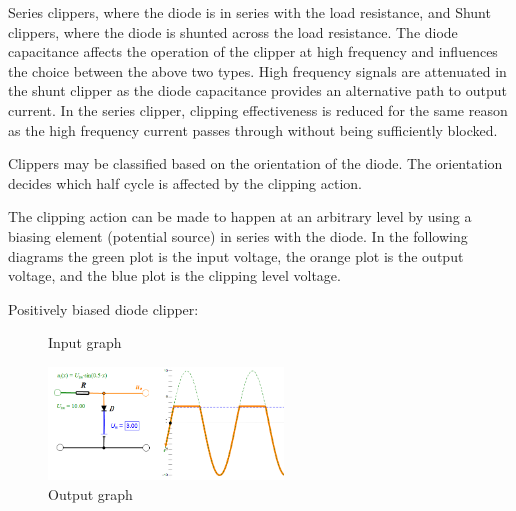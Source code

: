 \documentclass{article}
\begin{document}
Series clippers, where the diode is in series with the load resistance, and
Shunt clippers, where the diode is shunted across the load resistance.
The diode capacitance affects the operation of the clipper at high frequency and influences the choice between the above two types. High frequency signals are attenuated in the shunt clipper as the diode capacitance provides an alternative path to output current. In the series clipper, clipping effectiveness is reduced for the same reason as the high frequency current passes through without being sufficiently blocked.

Clippers may be classified based on the orientation of the diode. The orientation decides which half cycle is affected by the clipping action.

The clipping action can be made to happen at an arbitrary level by using a biasing element (potential source) in series with the diode. In the following diagrams the green plot is the input voltage, the orange plot is the output voltage, and the blue plot is the clipping level voltage.

\large Positively biased diode clipper:\\

\begin{figure}[H]
\caption{Input graph}
\end{figure}

\begin{figure}[H]
\centering
	\includegraphics[height=3cm]{wave.png}
	\caption{Output graph}
\end{figure}
\end{document}
